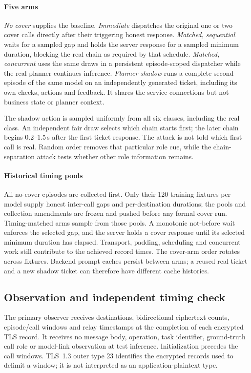 \paragraph{Five arms}
\emph{No cover} supplies the baseline. \emph{Immediate} dispatches the original one or two cover calls directly after their triggering honest response. \emph{Matched, sequential} waits for a sampled gap and holds the server response for a sampled minimum duration, blocking the real chain as required by that schedule. \emph{Matched, concurrent} uses the same draws in a persistent episode-scoped dispatcher while the real planner continues inference. \emph{Planner shadow} runs a complete second episode of the same model on an independently generated ticket, including its own checks, actions and feedback. It shares the service connections but not business state or planner context.

The shadow action is sampled uniformly from all six classes, including the real class. An independent fair draw selects which chain starts first; the later chain begins 0.2--1.5\,s after the first ticket response. The attack is not told which first call is real. Random order removes that particular role cue, while the chain-separation attack tests whether other role information remains.

\paragraph{Historical timing pools}
All no-cover episodes are collected first. Only their 120 training fixtures per model supply honest inter-call gaps and per-destination durations; the pools and collection amendments are frozen and pushed before any formal cover run. Timing-matched arms sample from those pools. A monotonic not-before wait enforces the selected gap, and the server holds a cover response until its selected minimum duration has elapsed. Transport, padding, scheduling and concurrent work still contribute to the achieved record times. The cover-arm order rotates across fixtures. Backend prompt caches persist between arms; a reused real ticket and a new shadow ticket can therefore have different cache histories.

\subsection{Observation and independent timing check}
The primary observer receives destinations, bidirectional ciphertext counts, episode/call windows and relay timestamps at the completion of each encrypted TLS record. It receives no message body, operation, task identifier, ground-truth call role or model-link observation at test inference. Initialization precedes the call windows. TLS~1.3 outer type 23 identifies the encrypted records used to delimit a window; it is not interpreted as an application-plaintext type.

